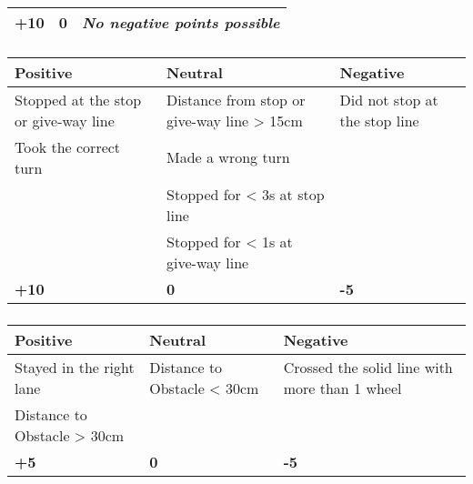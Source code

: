 {\begin{table}[H]
\begin{tabularx}{\textwidth}{XXX}
			\topstrut
			\textbf{+10}                           & \textbf{0}                         & \textit{No negative points possible} \\
			\bottomrule
		\end{tabularx}
	\end{table}

	\subsubsection*{}
	\begin{table}[H]
		\begin{tabularx}{\textwidth}{XXX}
			\toprule
			\textbf{Positive}                    & \textbf{Neutral}                           & \textbf{Negative}                              \\
			\midrule
			Stopped at the stop or give-way line & Distance from stop or give-way line > 15cm & Did not stop at the stop line \footnotemark[1] \\
			Took the correct turn                & Made a wrong turn \footnotemark[2]         &                                                \\
			                                     & Stopped for < 3s at stop line              &                                                \\
			                                     & Stopped for < 1s at give-way line          &                                                \\
			\topstrut
			\textbf{+10}                         & \textbf{0}                                 & \textbf{-5}                                    \\
			\bottomrule
		\end{tabularx}
	\end{table}

	\newpage


	\subsubsection*{}
	\begin{table}[H]
		\begin{tabularx}{\textwidth}{XXX}
			\toprule
			\textbf{Positive}           & \textbf{Neutral}            & \textbf{Negative}                             \\
			\midrule
			Stayed in the right lane    & Distance to Obstacle < 30cm & Crossed the solid line with more than 1 wheel \\
			Distance to Obstacle > 30cm &                             &                                               \\
			\topstrut
			\textbf{+5}                 & \textbf{0}                  & \textbf{-5}                                   \\
			\bottomrule
		\end{tabularx}
	\end{table}

}
